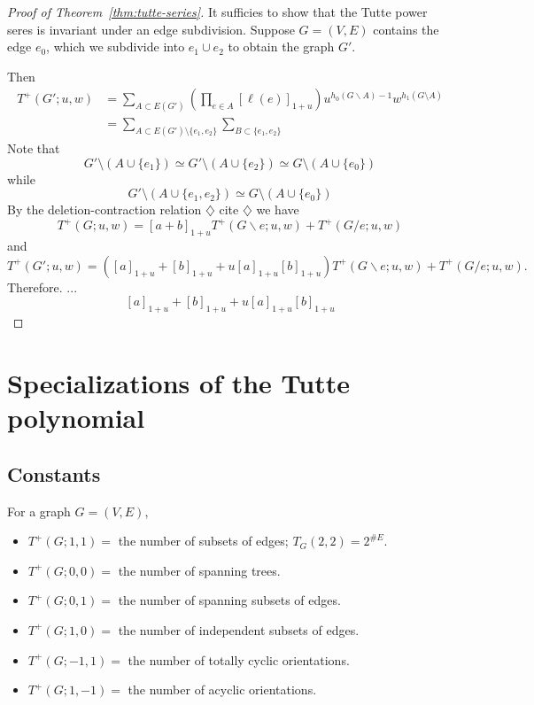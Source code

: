 \documentclass{amsart}
\theoremstyle{definition}
\newcommand{\harry}[1]{{\color{red} \sf $\diamondsuit$  {#1} $\diamondsuit$ }}
\newcommand{\note}[1]{\harry{#1}}
\begin{document}
\begin{proof}[Proof of Theorem~\ref{thm:tutte-series}]
It sufficies to show that the Tutte power seres is invariant 
under an edge subdivision.
Suppose $G = (V,E)$ contains the edge $e_0$, which we subdivide into $e_1 \cup e_2$ to obtain the graph $G'$.

Then
\begin{align*}
T^+(G'; u,w) &= \sum_{A \subset E(G')} \left( \prod_{e \in A} [\ell(e)]_{1+u} \right) u^{h_0(G\backslash A)-1} w^{h_1(G\setminus A)}  \\
&= \sum_{A \subset E(G') \setminus\{e_1,e_2\}} \sum_{B \subset \{e_1,e_2\}} 
\end{align*}
Note that
$$
G' \setminus (A \cup \{e_1\}) \simeq G' \setminus (A \cup \{e_2\}) \simeq G \setminus (A \cup \{e_0\})
$$
while
$$
G' \setminus (A \cup \{e_1,e_2\}) \simeq G \setminus (A \cup \{e_0\}) 
$$
By the deletion-contraction relation \note{cite}
we have
$$
T^+(G; u,w) = [a+b]_{1+u} T^+(G\backslash e; u,w) + T^+(G/e; u,w)
$$
and 
$$
T^+(G'; u,w) = ([a]_{1+u} + [b]_{1+u} + u[a]_{1+u}[b]_{1+u}) T^+(G\backslash e; u,w) + T^+(G/e; u,w) .
$$
Therefore. ... 
$$
[a]_{1+u} + [b]_{1+u} + u [a]_{1+u} [b]_{1+u}
$$
\end{proof}

\section{Specializations of the Tutte polynomial}

\subsection{Constants}
For a graph $G = (V,E)$,
\begin{itemize}
\item 
$T^+(G;1,1)=$  the number of subsets of edges;
$T_G(2,2) = 2^{\# E}$.

\item 
$T^+(G;0,0) =$ the number of spanning trees.

\item 
$T^+(G;0,1) =$ the number of spanning subsets of edges.

\item 
$T^+(G;1,0) =$ the number of independent subsets of edges.

\item 
$T^+(G;-1,1) =$ the number of totally cyclic orientations.

\item 
$T^+(G;1,-1) =$ the number of acyclic orientations.
\end{itemize}
\end{document}
